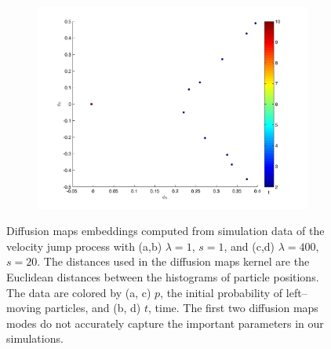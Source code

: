 \documentclass[prl,preprint]{revtex4-1}
\begin{document}
\begin{figure}[htb]
\begin{subfigure}{0.5\textwidth}
\caption{}
\end{subfigure}
\begin{subfigure}{0.5\textwidth}
\includegraphics[width=\textwidth]{rawhist_t_400}
\caption{}
\end{subfigure}
\caption{Diffusion maps embeddings computed from simulation data of the velocity jump process with (a,b) $\lambda=1$, $s=1$, and (c,d) $\lambda=400$, $s=20$. The distances used in the diffusion maps kernel are the Euclidean distances between the histograms of particle positions. The data are colored by (a, c) $p$, the initial probability of left--moving particles, and (b, d) $t$, time. The first two diffusion maps modes do not accurately capture the important parameters in our simulations.}
\label{fig:dmaps_embed}
\end{figure}
\end{document}
